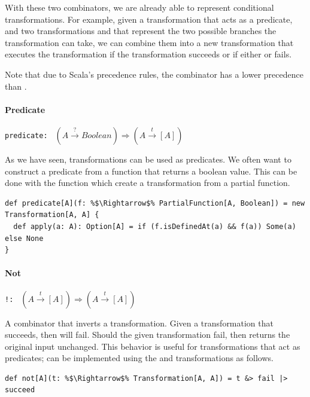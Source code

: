 With these two combinators, we are already able to represent conditional transformations. For example, given a transformation  that acts as a predicate, and two transformations  and  that represent the two possible branches the transformation can take, we can combine them into a new transformation  that executes the  transformation if the  transformation succeeds or  if either  or  fails.

Note that due to Scala's precedence rules, the \src{|>} combinator has a lower precedence than \src{\&>}.

\paragraph{Predicate} \hfill \lstinline{predicate: } $(A \overset{?}{\rightarrow} Boolean) \Rightarrow (A \overset{t}{\rightarrow} [A])$

\vspace{7pt} As we have seen, transformations can be used as predicates. We often want to construct a predicate from a function that returns a boolean value. This can be done with the  function which create a transformation from a partial function.

\begin{lstlisting}
def predicate[A](f: %$\Rightarrow$% PartialFunction[A, Boolean]) = new Transformation[A, A] {
  def apply(a: A): Option[A] = if (f.isDefinedAt(a) && f(a)) Some(a) else None
}
\end{lstlisting}

\paragraph{Not} \hfill \lstinline{!: } $(A \overset{t}{\rightarrow} [A]) \Rightarrow (A \overset{t}{\rightarrow} [A])$

\vspace{7pt} A combinator that inverts a transformation. Given a transformation that succeeds, then  will fail. Should the given transformation fail, then  returns the original input unchanged. This behavior is useful for transformations that act as predicates;  can be implemented using the  and  transformations as follows.

\begin{lstlisting}
def not[A](t: %$\Rightarrow$% Transformation[A, A]) = t &> fail |> succeed
\end{lstlisting}


